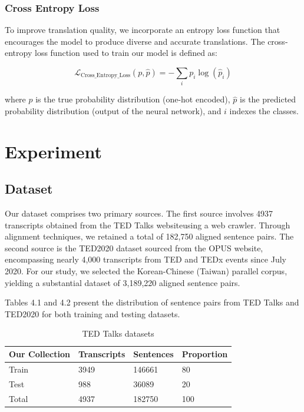 \documentclass[PhD]{PHlab-thesis}
\begin{document}
\subsection{Cross Entropy Loss}
To improve translation quality, we incorporate an entropy loss function \cite{zhang2018generalized}that encourages the model to produce diverse and accurate translations. The cross-entropy loss function used to train our model is defined as:

\[
\mathcal{L}_{\text{Cross_Entropy_Loss}}(p, \hat{p}) = -\sum_{i} p_i \log(\hat{p}_i)
\]

where $p$ is the true probability distribution (one-hot encoded), $\hat{p}$ is the predicted probability distribution (output of the neural network), and $i$ indexes the classes.

\chapter{Experiment}
\section{Dataset}
Our dataset comprises two primary sources. The first source involves 4937 transcripts obtained from the TED Talks website\cite{tedTalks}using a web crawler. Through alignment techniques, we retained a total of 182,750 aligned sentence pairs. The second source is the TED2020 dataset\cite{reimers-2020-multilingual-sentence-bert} sourced from the OPUS website, encompassing nearly 4,000 transcripts from TED and TEDx events since July 2020. For our study, we selected the Korean-Chinese (Taiwan) parallel corpus, yielding a substantial dataset of 3,189,220 aligned sentence pairs.

Tables 4.1 and 4.2 present the distribution of sentence pairs from TED Talks and TED2020 for both training and testing datasets.


\begin{table}
\begin{tabularx}{0.9\linewidth}{p{3cm} p{3cm} p{3cm} p{3cm}}
Our Collection & Transcripts & Sentences & Proportion\\
\toprule
Train &  3949 & 146661 & 80\\[.3ex]
Test  &   988 & 36089 & 20 \\[.3ex]
\toprule
Total  &  4937 & 182750 & 100\\
\bottomrule
\end{tabularx}
\caption{TED Talks datasets}
\label{tab:notation}
\end{table}
\end{document}

